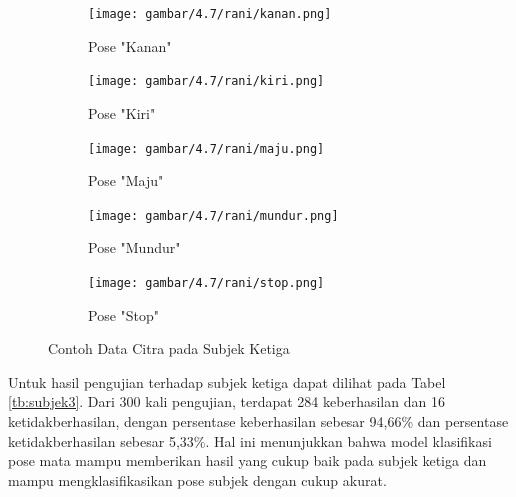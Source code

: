 \begin{figure}[H]
  \centering
  \begin{subfigure}[b]{0.329\linewidth}
      \texttt{[image: gambar/4.7/rani/kanan.png]}
      \caption{Pose "Kanan"}
      \label{fig:rani1}
  \end{subfigure}
  \hfill %
  \begin{subfigure}[b]{0.329\linewidth}
    \texttt{[image: gambar/4.7/rani/kiri.png]}
    \caption{Pose "Kiri"}
    \label{fig:rani2}
  \end{subfigure}
  \vspace{1cm} %
  \begin{subfigure}[b]{0.329\linewidth}
    \texttt{[image: gambar/4.7/rani/maju.png]}
    \caption{Pose "Maju"}
    \label{fig:rani3}
  \end{subfigure}
  \begin{subfigure}[b]{0.32\linewidth}
    \texttt{[image: gambar/4.7/rani/mundur.png]}
    \caption{Pose "Mundur"}
    \label{fig:rani4}
  \end{subfigure}
  \begin{subfigure}[b]{0.32\linewidth}
    \texttt{[image: gambar/4.7/rani/stop.png]}
    \caption{Pose "Stop"}
    \label{fig:rani5}
  \end{subfigure}
  \caption{Contoh Data Citra pada Subjek Ketiga}
  \label{fig:subjek3}
\end{figure}

Untuk hasil pengujian terhadap subjek ketiga dapat dilihat pada Tabel \ref{tb:subjek3}. Dari 300 kali pengujian, terdapat 284 keberhasilan dan 16 ketidakberhasilan, dengan persentase keberhasilan sebesar 94,66\% dan persentase ketidakberhasilan sebesar 5,33\%. Hal ini menunjukkan bahwa model klasifikasi pose mata mampu memberikan hasil yang cukup baik pada subjek ketiga dan mampu mengklasifikasikan pose subjek dengan cukup akurat.

